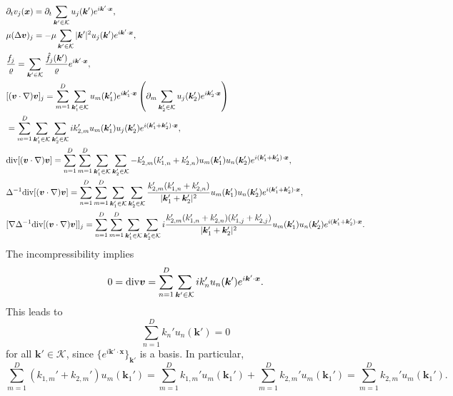 \documentclass[a4paper,11pt,fleqn]{article}
\begin{document}
\begin{align}
    &\partial_t v_j({\bm x}) = \partial_t \sum_{{\bm k}'\in \mathcal{K}}{u_j({\bm k}')e^{i{\bm k}'\cdot{\bm x}}}, \\
    &\mu (\Delta {\bm v})_j = -\mu \sum_{{\bm k}'\in \mathcal{K}}{|{\bm k}'|^2 u_j({\bm k}')e^{i{\bm k}'\cdot{\bm x}}}, \\
    &\frac{f_j}{\varrho} = \sum_{{\bm k}'\in \mathcal{K}}{\frac{\hat{f}_j({\bm k}')}{\varrho}e^{i{\bm k}'\cdot{\bm x}}}, \\
    &[({\bm v}\cdot \nabla){\bm v}]_j = \sum_{m=1}^D\sum_{{\bm k}_1'\in \mathcal{K}}{u_m({\bm k}_1')e^{i{\bm k}_1'\cdot{\bm x}}}\left(\partial_{m}\sum_{{\bm k}_2'\in \mathcal{K}}{u_j({\bm k}_2')e^{i{\bm k}_2'\cdot{\bm x}}}\right) \nonumber \\
    & =  \sum_{m=1}^D\sum_{{\bm k}_1'\in \mathcal{K}}\sum_{{\bm k}_2'\in \mathcal{K}} ik_{2,m}' u_m({\bm k}_1')u_j({\bm k}_2')e^{i({\bm k}_1'+{\bm k}_2')\cdot{\bm x}}, \label{eq. nsterm1}\\
    &{\rm div}[({\bm v}\cdot \nabla){\bm v}] = \sum_{n=1}^D\sum_{m=1}^D\sum_{{\bm k}_1'\in \mathcal{K}}\sum_{{\bm k}_2'\in \mathcal{K}} -k_{2,m}'(k_{1,n}'+k_{2,n}') u_m({\bm k}_1')u_n({\bm k}_2')e^{i({\bm k}_1'+{\bm k}_2')\cdot{\bm x}}, \nonumber \\
    &\Delta^{-1}{\rm div}[({\bm v}\cdot \nabla){\bm v}] = \sum_{n=1}^D\sum_{m=1}^D\sum_{{\bm k}_1'\in \mathcal{K}}\sum_{{\bm k}_2'\in \mathcal{K}} \frac{k_{2,m}'(k_{1,n}'+k_{2,n}')}{|{\bm k}_1' + {\bm k}_2'|^2} u_m({\bm k}_1')u_n({\bm k}_2')e^{i({\bm k}_1'+{\bm k}_2')\cdot{\bm x}}, \nonumber \\
    &[\nabla \Delta^{-1}{\rm div}[({\bm v}\cdot \nabla){\bm v}]]_j = \sum_{n=1}^D\sum_{m=1}^D\sum_{{\bm k}_1'\in \mathcal{K}}\sum_{{\bm k}_2'\in \mathcal{K}} i\frac{k_{2,m}'(k_{1,n}'+k_{2,n}')(k_{1,j}'+k_{2,j}')}{|{\bm k}_1' + {\bm k}_2'|^2} u_m({\bm k}_1')u_n({\bm k}_2')e^{i({\bm k}_1'+{\bm k}_2')\cdot{\bm x}}. \label{eq. nsterm2}
\end{align}
The incompressibility implies 
\begin{align}
    0 = {\rm div}{\bm v} = \sum_{n=1}^D\sum_{{\bm k}'\in \mathcal{K}}{ik_n' u_n({\bm k}')e^{i{\bm k}'\cdot{\bm x}}}.
\end{align}
This leads to 
\begin{equation}
    \sum_{n=1}^D k_n' u_n({\bm k}') = 0
\end{equation}
for all ${\bm k}'\in \mathcal{K}$, since $\{e^{i{\bm k}'\cdot{\bm x}}\}_{{\bm k}'}$ is a basis. In particular, 
\begin{equation}
    \sum_{m=1}^D (k_{1,m}' + k_{2,m}')u_m({\bm k}_1') = \sum_{m=1}^Dk_{1,m}'u_m({\bm k}_1')+\sum_{m=1}^Dk_{2,m}'u_m({\bm k}_1') = \sum_{m=1}^Dk_{2,m}'u_m({\bm k}_1').
\end{equation}
\end{document}
